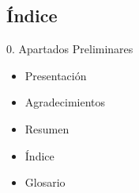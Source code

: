 \begin{tcolorbox}[breakable]

    \subsection*{\Large{Índice}}
    \begin{syllabus}
        \item[0.] Apartados Preliminares
        \begin{itemize}
            \item Presentación
            \item Agradecimientos
            \item Resumen
            \item Índice
            \item Glosario
        \end{itemize}
    \end{syllabus}


\end{tcolorbox}
